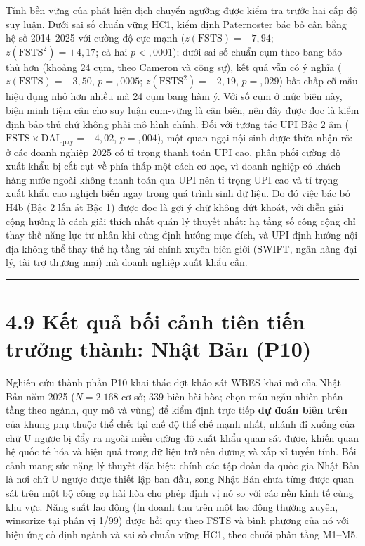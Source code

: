 \documentclass[
  a4paper,
  13pt]{extreport}
\begin{document}
Tính bền vững của phát hiện dịch chuyển ngưỡng được kiểm tra trước hai
cấp độ suy luận. Dưới sai số chuẩn vững HC1, kiểm định Paternoster bác
bỏ cân bằng hệ số 2014--2025 với cường độ cực mạnh
(\(z(\mathrm{FSTS}) = -7{,}94\); \(z(\mathrm{FSTS}^2) = +4{,}17\); cả
hai \(p < {,}0001\)); dưới sai số chuẩn cụm theo bang bảo thủ hơn
(khoảng 24 cụm, theo Cameron và cộng sự), kết quả vẫn có ý nghĩa
(\(z(\mathrm{FSTS}) = -3{,}50\), \(p = {,}0005\);
\(z(\mathrm{FSTS}^2) = +2{,}19\), \(p = {,}029\)) bất chấp cỡ mẫu hiệu
dụng nhỏ hơn nhiều mà 24 cụm bang hàm ý. Với số cụm ở mức biên này, biện
minh tiệm cận cho suy luận cụm-vững là cận biên, nên đây được đọc là
kiểm định bảo thủ chứ không phải mô hình chính. Đối với tương tác UPI
Bậc 2 âm (\(\mathrm{FSTS} \times \mathrm{DAI}_{\text{epay}} = -4{,}02\),
\(p = {,}004\)), một quan ngại nội sinh được thừa nhận rõ: ở các doanh
nghiệp 2025 có tỉ trọng thanh toán UPI cao, phân phối cường độ xuất khẩu
bị cắt cụt về phía thấp một cách cơ học, vì doanh nghiệp có khách hàng
nước ngoài không thanh toán qua UPI nên tỉ trọng UPI cao và tỉ trọng
xuất khẩu cao nghịch biến ngay trong quá trình sinh dữ liệu. Do đó việc
bác bỏ H4b (Bậc 2 lấn át Bậc 1) được đọc là gợi ý chứ không dứt khoát,
với diễn giải cộng hưởng là cách giải thích nhất quán lý thuyết nhất: hạ
tầng số công cộng chỉ thay thế năng lực tư nhân khi cùng định hướng mục
đích, và UPI định hướng nội địa không thể thay thế hạ tầng tài chính
xuyên biên giới (SWIFT, ngân hàng đại lý, tài trợ thương mại) mà doanh
nghiệp xuất khẩu cần.

\begin{center}\rule{0.5\linewidth}{0.5pt}\end{center}

\hypertarget{kux1ebft-quux1ea3-bux1ed1i-cux1ea3nh-tiuxean-tiux1ebfn-trux1b0ux1edfng-thuxe0nh-nhux1eadt-bux1ea3n-p10}{%
\section{4.9 Kết quả bối cảnh tiên tiến trưởng thành: Nhật Bản
(P10)}\label{kux1ebft-quux1ea3-bux1ed1i-cux1ea3nh-tiuxean-tiux1ebfn-trux1b0ux1edfng-thuxe0nh-nhux1eadt-bux1ea3n-p10}}

Nghiên cứu thành phần P10 khai thác đợt khảo sát WBES khai mở của Nhật
Bản năm 2025 (\(N = 2.168\) cơ sở; 339 biến hài hòa; chọn mẫu ngẫu nhiên
phân tầng theo ngành, quy mô và vùng) để kiểm định trực tiếp \textbf{dự
đoán biên trên} của khung phụ thuộc thể chế: tại chế độ thể chế mạnh
nhất, nhánh đi xuống của chữ U ngược bị đẩy ra ngoài miền cường độ xuất
khẩu quan sát được, khiến quan hệ quốc tế hóa và hiệu quả trong dữ liệu
trở nên dương và xấp xỉ tuyến tính. Bối cảnh mang sức nặng lý thuyết đặc
biệt: chính các tập đoàn đa quốc gia Nhật Bản là nơi chữ U ngược được
thiết lập ban đầu, song Nhật Bản chưa từng được quan sát trên một bộ
công cụ hài hòa cho phép định vị nó so với các nền kinh tế cùng khu vực.
Năng suất lao động (ln doanh thu trên một lao động thường xuyên,
winsorize tại phân vị 1/99) được hồi quy theo FSTS và bình phương của nó
với hiệu ứng cố định ngành và sai số chuẩn vững HC1, theo chuỗi phân
tầng M1--M5.
\end{document}
